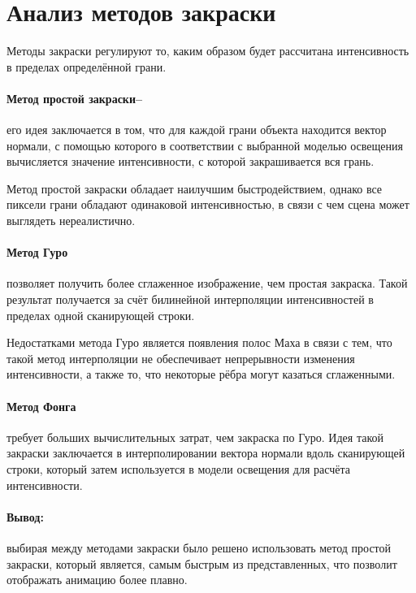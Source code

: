 \section{Анализ методов закраски}
\label{sec:color}
Методы закраски регулируют то, каким образом будет рассчитана интенсивность в пределах определённой грани.
\paragraph{Метод простой закраски--} его идея заключается в том, что для каждой грани объекта находится вектор нормали, с помощью которого в соответствии с выбранной моделью освещения вычисляется значение интенсивности, с которой закрашивается вся грань.
\par Метод простой закраски обладает наилучшим быстродействием, однако все пиксели грани обладают одинаковой интенсивностью, в связи с чем сцена может выглядеть нереалистично.

\paragraph{Метод Гуро} позволяет получить более сглаженное изображение, чем простая закраска. Такой результат получается за счёт билинейной интерполяции интенсивностей в пределах одной сканирующей строки.
\par Недостатками метода Гуро является появления полос Маха в связи с тем, что такой метод интерполяции не обеспечивает непрерывности изменения интенсивности, а также то, что некоторые рёбра могут казаться сглаженными.

\paragraph{Метод Фонга} требует больших вычислительных затрат, чем закраска по Гуро. Идея такой закраски заключается в интерполировании вектора нормали вдоль сканирующей строки, который затем используется в модели освещения для расчёта интенсивности.

\paragraph{Вывод:} выбирая между методами закраски было решено использовать метод простой закраски, который является, самым быстрым из представленных, что позволит отображать анимацию более плавно.

